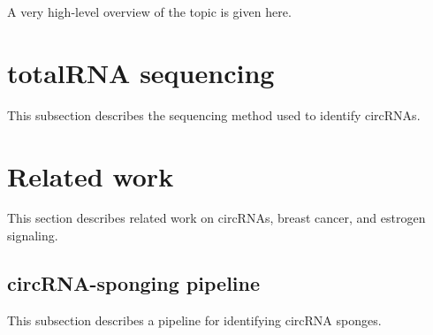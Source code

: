 A very high-level overview of the topic is given here.

\lipsum[1]





\section{totalRNA sequencing}
This subsection describes the sequencing method used to identify circRNAs.

\lipsum[2]

\section{Related work}
This section describes related work on circRNAs, breast cancer, and estrogen
signaling.

\subsection{circRNA-sponging pipeline}
This subsection describes a pipeline for identifying circRNA sponges.
